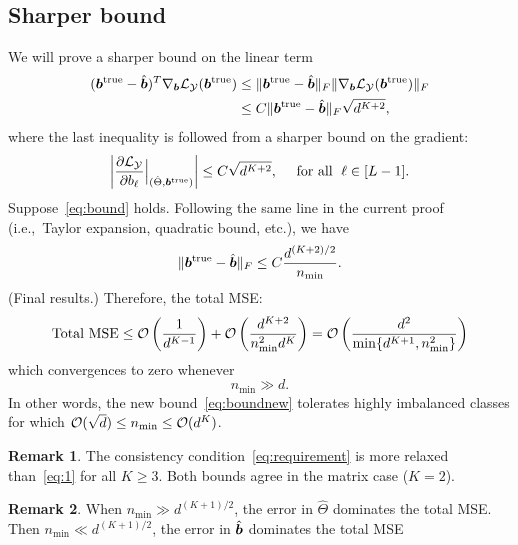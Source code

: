 \documentclass[11pt]{article}
\theoremstyle{plain}
\theoremstyle{definition}
\newtheorem{rmk}{Remark}
\begin{document}
\subsection{Sharper bound}
We will prove a sharper bound on the linear term
\begin{align}\label{eq:linearb}
(\bm{b}^{\mathrm{true}}-\hat{\bm{b}})^T\nabla_{\bm{b}}\mathcal{L}_{\mathcal{Y}}(\bm{b}^{\mathrm{true}})&\leq \lVert\bm{b}^{\mathrm{true}}-\hat{\bm{b}}\rVert_F\lVert\nabla_{\bm{b}}\mathcal{L}_{\mathcal{Y}}(\bm{b}^{\mathrm{true}})\rVert_F\\
&\leq C\lVert\bm{b}^{\mathrm{true}}-\hat{\bm{b}}\rVert_F \sqrt{d^{K+2}},
\end{align}
where the last inequality is followed from a sharper bound on the gradient:
\begin{equation}\label{eq:bound}
\left|{\partial \mathcal{L}_{\mathcal{Y}}\over \partial b_\ell}\Big|_{(\hat \Theta, \bm{b}^{\mathrm{true}})}\right|   \leq C \sqrt{d^{K+2}}, \quad \textrm{ for all } \; \ell\in [L-1].
\end{equation}
Suppose~\eqref{eq:bound} holds. Following the same line in the current proof (i.e.,\ Taylor expansion, quadratic bound, etc.), we have
\[
\lVert\bm{b}^{\mathrm{true}}-\hat {\bm{b}}\rVert_F\leq C{d^{(K+2)/2}  \over n_{\min}}.
\]
{\color{red} (Final results.) Therefore, the total MSE:
\begin{equation}\label{eq:boundnew}
\text{Total MSE}\leq \mathcal{O}\left({1\over d^{K-1}}\right)+\mathcal{O}\left(d^{K+2}\over n^2_{\min} d^K\right)=\mathcal{O}\left({d^2\over \min\{d^{K+1}, n^2_{\min}\}}\right)
\end{equation}
which convergences to zero whenever
\begin{equation}\label{eq:requirement}
n_{\min} \gg d.
\end{equation}
}
In other words, the new bound~\eqref{eq:boundnew} tolerates highly imbalanced classes for which $\mathcal{O}(\sqrt{d})\leq n_{\min}\leq \mathcal{O}(d^K)$.

\begin{rmk}
The consistency condition~\eqref{eq:requirement} is more relaxed than~\eqref{eq:1} for all $K\geq 3$. Both bounds agree in the matrix case ($K=2$). 
\end{rmk}

\begin{rmk}
When $n_{\min}\gg d^{(K+1)/2}$, the error in $\hat \Theta$ dominates the total MSE. Then $n_{\min}\ll d^{(K+1)/2}$, the error in $\hat {\bm{b}}$ dominates the total MSE
\end{rmk}
\end{document}
